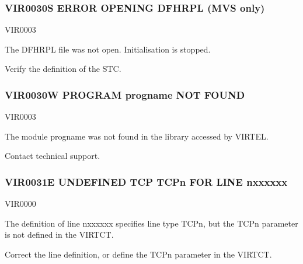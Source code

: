 \documentclass[letterpaper,10pt,english]{sphinxmanual}
\begin{document}
\subsubsection{VIR0030S ERROR OPENING DFHRPL (MVS only)}
\label{\detokenize{messages:vir0030s-error-opening-dfhrpl-mvs-only}}\begin{description}
\sphinxAtStartPar
VIR0003

\sphinxAtStartPar
The DFHRPL file was not open. Initialisation is stopped.

\sphinxAtStartPar
Verify the definition of the STC.

\end{description}


\subsubsection{VIR0030W PROGRAM progname NOT FOUND}
\label{\detokenize{messages:vir0030w-program-progname-not-found}}\begin{description}
\sphinxAtStartPar
VIR0003

\sphinxAtStartPar
The module progname was not found in the library accessed by VIRTEL.

\sphinxAtStartPar
Contact technical support.

\end{description}


\subsubsection{VIR0031E UNDEFINED TCP TCPn FOR LINE n\sphinxhyphen{}xxxxxx}
\label{\detokenize{messages:vir0031e-undefined-tcp-tcpn-for-line-n-xxxxxx}}\begin{description}
\sphinxAtStartPar
VIR0000

\sphinxAtStartPar
The definition of line n\sphinxhyphen{}xxxxxx specifies line type TCPn, but the TCPn parameter is not defined in the VIRTCT.

\sphinxAtStartPar
Correct the line definition, or define the TCPn parameter in the VIRTCT.

\end{description}
\end{document}
